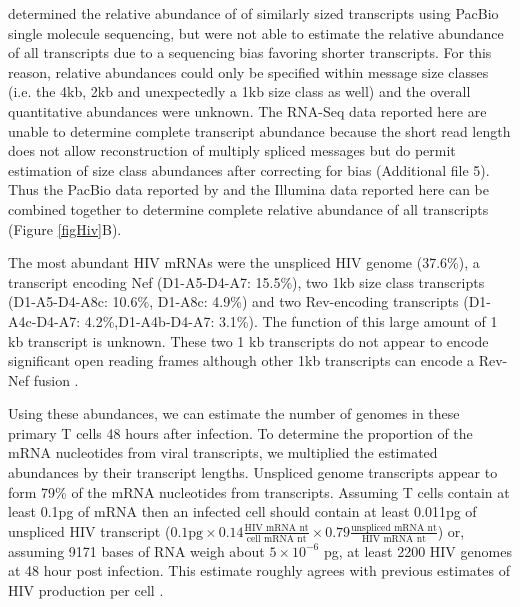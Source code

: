 \documentclass[../sherrill-Mix_thesis.tex]{subfiles}
\begin{document}
		\citet{Ocwieja2012} determined the relative abundance of \hivEight{} of similarly sized transcripts using PacBio single molecule sequencing, but were not able to estimate the relative abundance of all transcripts due to a sequencing bias favoring shorter transcripts.  For this reason, relative abundances could only be specified within message size classes (i.e. the 4kb, 2kb and unexpectedly a 1kb size class as well) and the overall quantitative abundances were unknown.  The RNA-Seq data reported here are unable to determine complete transcript abundance because the short read length does not allow reconstruction of multiply spliced messages but do permit estimation of size class abundances after correcting for \threePrime{} bias (Additional file 5). Thus the PacBio data reported by \citet{Ocwieja2012} and the Illumina data reported here can be combined together to determine complete relative abundance of all \hivEight{} transcripts (Figure \ref{figHiv}B). 

	   The most abundant HIV mRNAs were the unspliced HIV genome (37.6\%), a transcript encoding Nef (D1-A5-D4-A7: 15.5\%), two 1kb size class transcripts (D1-A5-D4-A8c: 10.6\%, D1-A8c: 4.9\%) and two Rev-encoding transcripts (D1-A4c-D4-A7: 4.2\%,D1-A4b-D4-A7: 3.1\%). The function of this large amount of 1 kb transcript is unknown. These two 1 kb transcripts do not appear to encode significant open reading frames although other 1kb transcripts can encode a Rev-Nef fusion \citep{Ocwieja2012}. 

		Using these abundances, we can estimate the number of \hivEight{} genomes in these primary T cells 48 hours after infection.  To determine the proportion of the mRNA nucleotides from viral transcripts, we multiplied the estimated abundances by their transcript lengths. Unspliced genome transcripts appear to form 79\% of the mRNA nucleotides from \hivEight{} transcripts. Assuming T cells contain at least 0.1pg of mRNA then an infected cell should contain at least 0.011pg of unspliced HIV transcript ($0.1\textrm{pg}\times 0.14\frac{\textrm{HIV mRNA nt}}{\textrm{cell mRNA nt}}\times 0.79\frac{\textrm{unspliced mRNA nt}}{\textrm{HIV mRNA nt}}$) or, assuming 9171 bases of RNA weigh about $5 \times 10^{-6}$ pg, at least 2200 HIV genomes at 48 hour post infection. This estimate roughly agrees with previous estimates of HIV production per cell \citep{Hockett1999,DeBoer2010,Whisnant2013}. 
\end{document}
